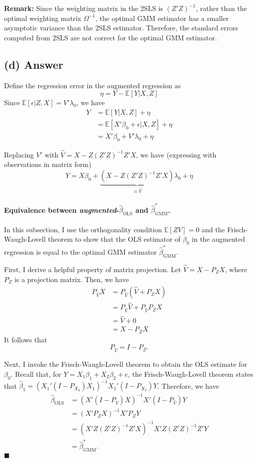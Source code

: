\documentclass[11pt]{article}
\theoremstyle{definition}
\theoremstyle{boldtitle} %
\numberwithin{equation}{section}
\numberwithin{figure}{section}
\numberwithin{table}{section}
\begin{document}
\noindent \textbf{Remark:} Since the weighting matrix in the 2SLS is $(Z'Z)^{-1}$, rather than the optimal weighting matrix $\Omega^{-1}$,
the optimal GMM estimator has a smaller asymptotic variance than the 2SLS estimator.
Therefore, the standard errors computed from 2SLS are not correct for the optimal GMM estimator.


\subsection{(d) Answer}

Define the regression error in the augmented regression as 
\[
\eta = Y - \mathbb{E}[Y|X, Z]
\]
Since $\mathbb{E}[\epsilon | Z, X] = V' \lambda_0$, we have 
\begin{align*}
  Y & = \mathbb{E}[Y|X, Z] + \eta \\
    & = \mathbb{E}[X'\beta_0 + \epsilon |X, Z] + \eta \\
    & = X'\beta_0 + V' \lambda_0 + \eta
\end{align*}


Replacing $V'$ with $\hat{V} = X - Z(Z'Z)^{-1} Z' X$, we have (expressing with observations in matrix form)
\[
Y =  X\beta_0 + \underbrace{(X - Z(Z'Z)^{-1} Z' X)}_{\equiv \hat{V}} \lambda_0 + \eta
\]

\paragraph{Equivalence between \textit{augmented}-$\hat{\beta}_{\text{OLS}}$ and $\hat{\beta}_{\text{GMM}}^*$.} 
In this subsection, I use the orthogonality condition $\mathbb{E}[ZV] = 0$ and the Frisch-Waugh-Lovell theorem to show that
the OLS estimator of $\beta_0$ in the augmented regression is equal to the optimal GMM estimator $\hat{\beta}_{\text{GMM}}^*$.

First, I derive a helpful property of matrix projection. 
Let $\hat{V} = X - P_Z X$, where $P_Z$ is a projection matrix.
Then, we have 
\begin{align*}
P_{\hat{V}} X & = P_{\hat{V}} (\hat{V} + P_Z X) \\ 
  & = P_{\hat{V}} \hat{V} + P_{\hat{V}} P_Z X \\ 
  & = \hat{V} + 0 \\ 
  & = X - P_Z X
\end{align*}
It follows that
\[
P_{\hat{V}} = I - P_Z.
\]

Next, I invoke the Frisch-Waugh-Lovell theorem to obtain the OLS estimate for $\beta_0$.
Recall that, for $Y = X_1 \beta_1 + X_2 \beta_2 + e$,
the Frisch-Waugh-Lovell theorem states that $\hat{\beta}_1 = (X_1' (I - P_{X_2}) X_1)^{-1} X_1' (I - P_{X_2}) Y$.
Therefore, we have 
\begin{align*}
\hat{\beta}_{\text{OLS}} & = (X' (I - P_{\hat{V}}) X)^{-1} X' (I - P_{\hat{V}}) Y \\ 
& = (X' P_Z X)^{-1} X' P_Z  Y \\
& = \left(X' Z (Z'Z)^{-1} Z' X \right)^{-1} X' Z (Z'Z)^{-1} Z' Y  \\
& = \hat{\beta}_{\text{GMM}}^*.
\end{align*}
\(\blacksquare\)




\end{document}
